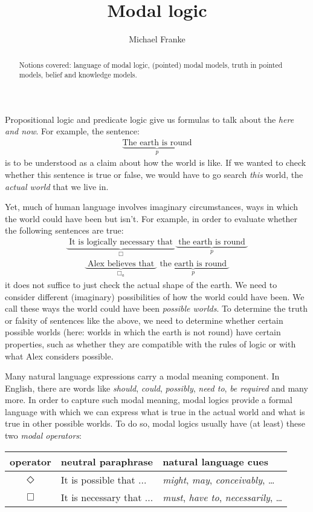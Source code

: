 \documentclass[nobib,nofonts]{tufte-handout}
\title{Modal logic}
\author{Michael Franke}
\date{} %
\begin{document}
\maketitle

\begin{abstract}
\noindent
Notions covered:
language of modal logic,
(pointed) modal models,
truth in pointed models,
belief and knowledge models.
\end{abstract}

\noindent Propositional logic and predicate logic give us formulas to talk about the \emph{here and now}.
For example, the sentence:
%
\begin{align*}
  \underbrace{\text{The earth is round}}_{p}
\end{align*}
%
is to be understood as a claim about how the world is like.
If we wanted to check whether this sentence is true or false, we would have to go search \emph{this} world, the \emph{actual world} that we live in.

Yet, much of human language involves imaginary circumstances, ways in which the world could have been but isn't.
For example, in order to evaluate whether the following sentences are true:
\begin{align*}
  \underbrace{\text{ It is logically necessary that }}_{\Box}
  \underbrace{\text{ the earth is round }}_{p}
\end{align*}
\begin{align*}
  \underbrace{\text{ Alex believes that }}_{\Box_{a}}
  \underbrace{\text{ the earth is round }}_{p}
\end{align*}
it does not suffice to just check the actual shape of the earth.
We need to consider different (imaginary) possibilities of how the world could have been.
We call these ways the world could have been \emph{possible worlds}.
To determine the truth or falsity of sentences like the above, we need to determine whether certain possible worlds (here: worlds in which the earth is not round) have certain properties, such as whether they are compatible with the rules of logic or with what Alex considers possible.

Many natural language expressions carry a modal meaning component.
In English, there are words like \emph{should}, \emph{could}, \emph{possibly}, \emph{need to}, \emph{be required} and many more.
In order to capture such modal meaning, modal logics provide a formal language with which we can express what is true in the actual world and what is true in other possible worlds.
To do so, modal logics usually have (at least) these two \emph{modal operators}:
\begin{center}
  \begin{tabular}{cll}
    operator   & neutral paraphrase & natural language cues \\ \hline
    $\Diamond$ & It is possible that ... & \emph{might}, \emph{may}, \emph{conceivably}, \dots \\
    $\Box$     & It is necessary that ... & \emph{must}, \emph{have to}, \emph{necessarily}, \dots \\
  \end{tabular}
\end{center}
\end{document}
